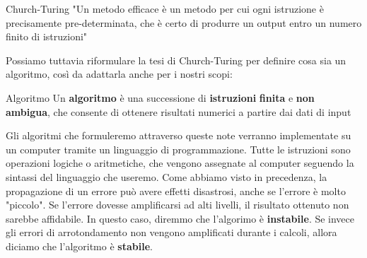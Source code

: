 \begin{quotebox}{Church-Turing}
    "Un metodo efficace è un metodo per cui ogni istruzione è precisamente pre-determinata, che è certo di produrre un output entro un numero finito di istruzioni"
\end{quotebox}

Possiamo tuttavia riformulare la tesi di Church-Turing per definire cosa sia un algoritmo, così da adattarla anche per i nostri scopi:

\begin{definition}{Algoritmo}
    Un \textbf{algoritmo} è una successione di \textbf{istruzioni} \textbf{finita} e \textbf{non ambigua}, che consente di ottenere risultati numerici a partire dai dati di input
\end{definition}

Gli algoritmi che formuleremo attraverso queste note verranno implementate su un computer tramite un linguaggio di programmazione. Tutte le istruzioni sono operazioni logiche o aritmetiche, che vengono assegnate al computer seguendo la sintassi del linguaggio che useremo.
\nl
Come abbiamo visto in precedenza, la propagazione di un errore può avere effetti disastrosi, anche se l'errore è molto "piccolo". Se l'errore dovesse amplificarsi ad alti livelli, il risultato ottenuto non sarebbe affidabile. In questo caso, diremmo che l'algorimo è \textbf{instabile}. Se invece gli errori di arrotondamento non vengono amplificati durante i calcoli, allora diciamo che l'algoritmo è \textbf{stabile}.

